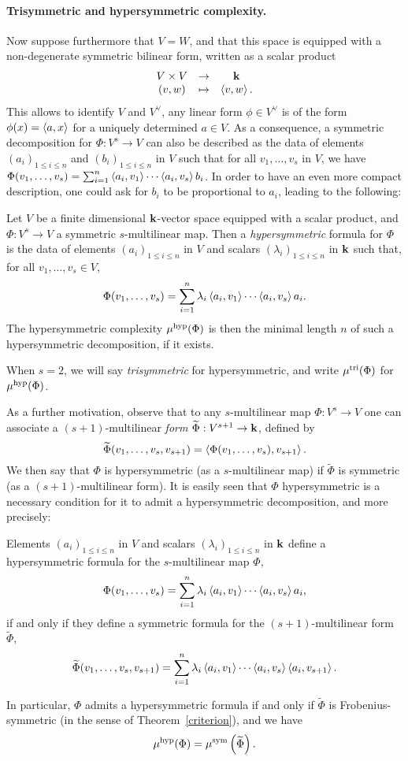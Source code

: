 \documentclass[11pt]{article}
\begin{document}
\paragraph{Trisymmetric and hypersymmetric complexity.}
Now suppose furthermore that $V=W$, and that this space is equipped with a
non-degenerate symmetric bilinear form, written as a scalar product
\[
\begin{array}{ccc}
V\times V &\to&\mathbf{k}\\
(v,w)&\mapsto&\left\langle v,w\right\rangle.
\end{array}
\]
This allows to identify $V$ and $V^\vee$, \ie any linear form $\phi\in V^\vee$
is of the form $\phi(x)=\left\langle a,x\right\rangle$ for a uniquely determined $a\in V$.
As a consequence, a symmetric decomposition for $\Phi:V^s\to V$ can also be described
as the data of elements $(a_i)_{1\leq i\leq n}$ and $(b_i)_{1\leq i\leq n}$ in $V$
such that for all $v_1,\dots,v_s$ in $V$,
we have $\Phi(v_1,\dots,v_s)=\sum_{i=1}^{n}\left\langle a_i,v_1\right\rangle\cdots\left\langle a_i,v_s\right\rangle b_i$.
In order to have an even more compact description, one could ask for $b_i$ to be proportional to $a_i$, leading to the following:
\begin{defi}
Let $V$ be a finite dimensional $\mathbf{k}$-vector space equipped with a scalar product,
and $\Phi:V^s\to V$ a symmetric $s$-multilinear map.
Then a \emph{hypersymmetric} formula for $\Phi$ is the data of
elements $(a_i)_{1\leq i\leq n}$ in $V$ and scalars $(\lambda_i)_{1\leq i\leq n}$ in $\mathbf{k}$ such that, for all $v_1,\dots,v_s\in V$,
\[
\Phi(v_1,\dots,v_s)=\sum_{i=1}^{n}\lambda_i\left\langle a_i,v_1\right\rangle\cdots\left\langle a_i,v_s\right\rangle a_i.
\]
The hypersymmetric complexity $\mu^{\textrm{hyp}}(\Phi)$ is then the minimal length $n$ of such a hypersymmetric decomposition, if it exists.

When $s=2$, we will say \emph{trisymmetric} for hypersymmetric,
and write $\mu^{\textrm{tri}}(\Phi)$ for $\mu^{\textrm{hyp}}(\Phi)$.
\end{defi}
As a further motivation, observe that to any $s$-multilinear map $\Phi:V^s\to V$
one can associate a $(s+1)$-multilinear \emph{form} $\widetilde{\Phi}:V^{s+1}\to \mathbf{k}$, defined by
\[
\widetilde{\Phi}(v_1,\dots,v_s,v_{s+1})=\left\langle\Phi(v_1,\dots,v_s),v_{s+1}\right\rangle.
\]
We then say that $\Phi$ is hypersymmetric (as a $s$-multilinear map)
if $\widetilde{\Phi}$ is symmetric (as a $(s+1)$-multilinear form).
It is easily seen that $\Phi$ hypersymmetric is a necessary condition for it to admit a hypersymmetric decomposition, and more precisely:
\begin{lm}
Elements $(a_i)_{1\leq i\leq n}$ in $V$ and scalars $(\lambda_i)_{1\leq i\leq n}$ in $\mathbf{k}$ define a hypersymmetric formula for the $s$-multilinear map $\Phi$,
\[
\Phi(v_1,\dots,v_s)=\sum_{i=1}^{n}\lambda_i\left\langle a_i,v_1\right\rangle\cdots\left\langle a_i,v_s\right\rangle a_i,
\]
if and only if they define a symmetric formula for the $(s+1)$-multilinear form $\widetilde{\Phi}$,
\[
\widetilde{\Phi}(v_1,\dots,v_s,v_{s+1})=\sum_{i=1}^{n}\lambda_i\left\langle a_i,v_1\right\rangle\cdots\left\langle a_i,v_s\right\rangle\left\langle a_i,v_{s+1}\right\rangle.
\]

In particular, $\Phi$ admits a hypersymmetric formula if and only if $\widetilde{\Phi}$ is Frobenius-symmetric (in the sense of Theorem~\ref{criterion}),
and we have
\[
\mu^{\textrm{hyp}}(\Phi)=\mu^{\textrm{sym}}\left(\widetilde{\Phi}\right).
\]
\end{lm}
\end{document}
